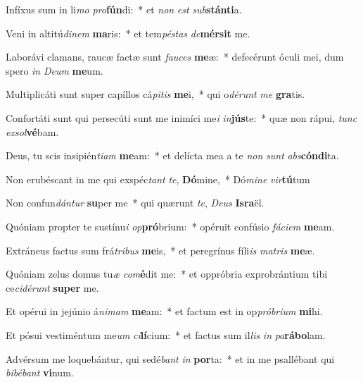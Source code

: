 \item Infíxus sum in li\textit{mo} \textit{pro}\textbf{fún}di:~* et \textit{non} \textit{est} \textit{sub}\textbf{stán}\textbf{ti}a.
\item Veni in altitú\textit{di}\textit{nem} \textbf{ma}ris:~* et tem\textit{pés}\textit{tas} \textit{de}\textbf{mér}\textbf{sit} me.
\item Laborávi clamans, raucæ factæ sunt \textit{fau}\textit{ces} \textbf{me}æ:~* defecérunt óculi mei, dum spero \textit{in} \textit{De}\textit{um} \textbf{me}um.
\item Multiplicáti sunt super capíllos cá\textit{pi}\textit{tis} \textbf{me}i,~* qui o\textit{dé}\textit{runt} \textit{me} \textbf{gra}tis.
\item Confortáti sunt qui persecúti sunt me inimíci me\textit{i} \textit{in}\textbf{jús}te:~* quæ non rápui, \textit{tunc} \textit{ex}\textit{sol}\textbf{vé}bam.
\item Deus, tu scis insipién\textit{ti}\textit{am} \textbf{me}am:~* et delícta mea a te \textit{non} \textit{sunt} \textit{abs}\textbf{cón}\textbf{di}ta.
\item Non erubéscant in me qui exspéc\textit{tant} \textit{te}, \textbf{Dó}mine,~* Dó\textit{mi}\textit{ne} \textit{vir}\textbf{tú}tum
\item Non confun\textit{dán}\textit{tur} \textbf{su}per me~* qui quærunt \textit{te}, \textit{De}\textit{us} \textbf{Is}\textbf{ra}ël.
\item Quóniam propter te sustínu\textit{i} \textit{op}\textbf{pró}brium:~* opéruit confúsio \textit{fá}\textit{ci}\textit{em} \textbf{me}am.
\item Extráneus factus sum frá\textit{tri}\textit{bus} \textbf{me}is,~* et peregrínus fíli\textit{is} \textit{ma}\textit{tris} \textbf{me}æ.
\item Quóniam zelus domus tu\textit{æ} \textit{com}\textbf{é}dit me:~* et oppróbria exprobrántium tibi ce\textit{ci}\textit{dé}\textit{runt} \textbf{su}\textbf{per} me.
\item Et opérui in jejúnio á\textit{ni}\textit{mam} \textbf{me}am:~* et factum est in op\textit{pró}\textit{bri}\textit{um} \textbf{mi}hi.
\item Et pósui vestiméntum me\textit{um} \textit{ci}\textbf{lí}cium:~* et factus sum il\textit{lis} \textit{in} \textit{pa}\textbf{rá}\textbf{bo}lam.
\item Advérsum me loquebántur, qui sedé\textit{bant} \textit{in} \textbf{por}ta:~* et in me psallébant qui \textit{bi}\textit{bé}\textit{bant} \textbf{vi}num.
